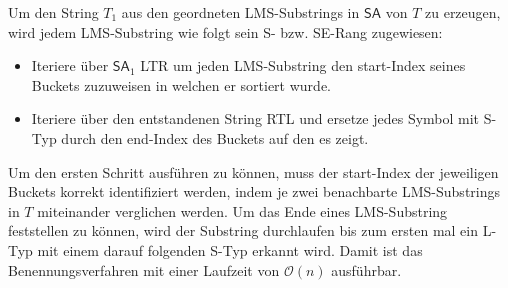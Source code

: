 Um den String $T_1$ aus den geordneten LMS-Substrings in $\mathsf{SA}$ von $T$ zu erzeugen, wird jedem LMS-Substring wie folgt sein S- bzw. SE-Rang zugewiesen:

\begin{itemize}
\item Iteriere über $\mathsf{SA}_1$ LTR um jeden LMS-Substring den start-Index seines Buckets zuzuweisen in welchen er sortiert wurde.
\item Iteriere über den entstandenen String RTL und ersetze jedes Symbol mit S-Typ durch den end-Index des Buckets auf den es zeigt.
\end{itemize}

Um den ersten Schritt ausführen zu können, muss der start-Index der jeweiligen Buckets korrekt identifiziert werden, indem je zwei benachbarte LMS-Substrings in $T$ miteinander verglichen werden. Um das Ende eines LMS-Substring feststellen zu können, wird der Substring durchlaufen bis zum ersten mal ein L-Typ mit einem darauf folgenden S-Typ erkannt wird. Damit ist das Benennungsverfahren mit einer Laufzeit von $\mathcal O(n)$ ausführbar.
